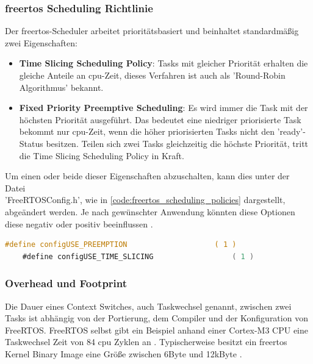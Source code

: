 \documentclass[../EDF Master Thesis.tex]{subfiles}
\begin{document}
\subsubsection{\ac{freertos} Scheduling Richtlinie} \label{section:freertos_scheduling_richtlinie}
Der \ac{freertos}-Scheduler arbeitet prioritätsbasiert und beinhaltet standardmäßig zwei Eigenschaften:
\begin{itemize}
    \item \textbf{Time Slicing Scheduling Policy}: Tasks mit gleicher Priorität erhalten die gleiche Anteile an \ac{cpu}-Zeit, dieses Verfahren ist auch als 'Round-Robin Algorithmus' bekannt.
    \item \textbf{Fixed Priority Preemptive Scheduling}: Es wird immer die Task  mit der höchsten Priorität ausgeführt.
                                                         Das bedeutet eine niedriger priorisierte Task bekommt nur \ac{cpu}-Zeit, wenn die höher priorisierten Tasks nicht den 'ready'-Status besitzen.
                                                         Teilen sich zwei Tasks gleichzeitig die höchste Priorität, tritt die Time Slicing Scheduling Policy in Kraft.
\end{itemize}
Um einen oder beide dieser Eigenschaften abzuschalten, kann dies unter der Datei \\'FreeRTOSConfig.h', wie in \autoref{code:freertos_scheduling_policies} dargestellt, abgeändert werden.
Je nach gewünschter Anwendung könnten diese Optionen diese negativ oder positiv beeinflussen \parencite{freertos-scheduling-policy}.
\begin{lstlisting}[language=C, caption=FreeRTOS Scheduling Policy Properties, label=code:freertos_scheduling_policies]
    #define configUSE_PREEMPTION                    ( 1 )
    #define configUSE_TIME_SLICING                  ( 1 )
\end{lstlisting}


\subsubsection{Overhead und Footprint} \label{section:overhead_und_footprint}
Die Dauer eines Context Switches, auch Taskwechsel genannt, zwischen zwei Tasks ist abhängig von der Portierung, dem Compiler und der Konfiguration von FreeRTOS.
FreeRTOS selbst gibt ein Beispiel anhand einer Cortex-M3 CPU eine Taskwechsel Zeit von 84 \ac{cpu} Zyklen an \parencite{freertos-overhead}.
Typischerweise besitzt ein \ac{freertos} Kernel Binary Image eine Größe zwischen 6Byte und 12kByte \parencite{freertos-footprint}.
\end{document}
